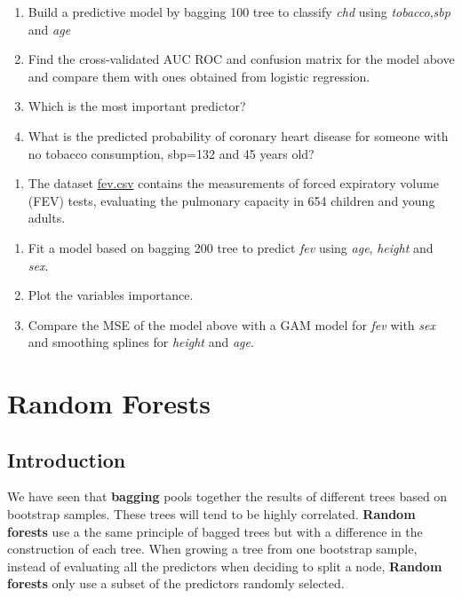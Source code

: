 \documentclass[
]{book}
\providecommand{\tightlist}{%
  \setlength{\itemsep}{0pt}\setlength{\parskip}{0pt}}
\begin{document}
\begin{enumerate}
\def\labelenumi{\alph{enumi})}
\item
  Build a predictive model by bagging 100 tree to classify \emph{chd} using
  \emph{tobacco},\emph{sbp} and \emph{age}
\item
  Find the cross-validated AUC ROC and confusion matrix for the model above
  and compare them with ones obtained from logistic regression.
\item
  Which is the most important predictor?
\item
  What is the predicted probability of coronary heart disease for someone
  with no tobacco consumption, sbp=132 and 45 years old?
\end{enumerate}

\begin{enumerate}
\def\labelenumi{\arabic{enumi})}
\setcounter{enumi}{1}
\tightlist
\item
  The dataset \href{https://www.dropbox.com/s/jeqdtq04zl9f0er/FEV.csv?dl=1}{fev.csv}
  contains the measurements of forced expiratory volume (FEV) tests,
  evaluating the pulmonary capacity in 654 children and young adults.
\end{enumerate}

\begin{enumerate}
\def\labelenumi{\alph{enumi})}
\item
  Fit a model based on bagging 200 tree to predict \emph{fev} using
  \emph{age}, \emph{height} and \emph{sex}.
\item
  Plot the variables importance.
\item
  Compare the MSE of the model above with a GAM model for \emph{fev} with \emph{sex} and
  smoothing splines for \emph{height} and \emph{age}.
\end{enumerate}

\chapter{Random Forests}\label{random-forests}

\section{Introduction}\label{RF1}

We have seen that \textbf{bagging} pools together the results of different trees
based on bootstrap samples. These trees will tend to be highly correlated.
\textbf{Random forests} use a the same principle of bagged trees but with a
difference in the construction of each tree. When growing a tree from one
bootstrap sample, instead of evaluating all the predictors when deciding to
split a node, \textbf{Random forests} only use a subset of the predictors
randomly selected.
\end{document}
